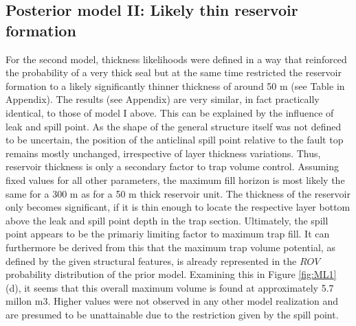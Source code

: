 		\subsection{Posterior model II: Likely thin reservoir formation}%
		For the second model, thickness likelihoods were defined in a way that reinforced the probability of a very thick seal but at the same time restricted the reservoir formation to a likely significantly thinner thickness of around 50 m (see Table in Appendix). The results (see Appendix) are very similar, in fact practically identical, to those of model I above. This can be explained by the influence of leak and spill point. As the shape of the general structure itself was not defined to be uncertain, the position of the anticlinal spill point relative to the fault top remains mostly unchanged, irrespective of layer thickness variations. Thus, reservoir thickness is only a secondary factor to trap volume control. Assuming fixed values for all other parameters, the maximum fill horizon is most likely the same for a 300 m as for a 50 m thick reservoir unit. The thickness of the reservoir only becomes significant, if it is thin enough to locate the respective layer bottom above the leak and spill point depth in the trap section. Ultimately, the spill point appears to be the primariy limiting factor to maximum trap fill. It can furthermore be derived from this that the maximum trap volume potential, as defined by the given structural features, is already represented in the $ROV$ probability distribution of the prior model. Examining this in Figure \ref{fig:ML1} (d), it seems that this overall maximum volume is found at approximately 5.7 millon m$3$. Higher values were not observed in any other model realization and are presumed to be unattainable due to the restriction given by the spill point.
	
